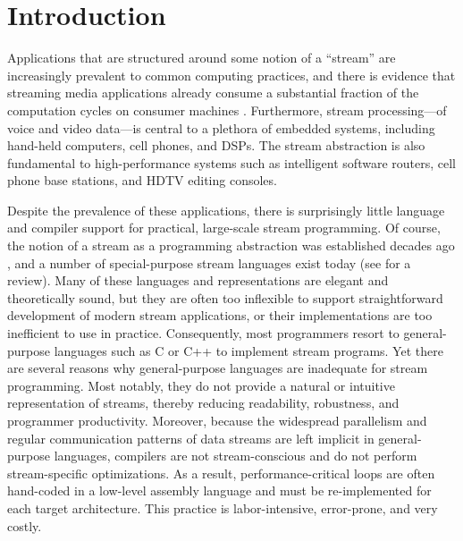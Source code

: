 \section{Introduction}

Applications that  are structured around  some notion of  a ``stream''
are increasingly prevalent to common computing practices, and there is
evidence   that  streaming  media   applications  already   consume  a
substantial fraction  of the  computation cycles on  consumer machines
\cite{rixner98bandwidthefficient}. Furthermore, stream processing---of voice and video
data---is  central  to  a  plethora  of  embedded  systems,  including
hand-held computers, cell phones,  and DSPs. The stream abstraction is
also  fundamental  to  high-performance  systems such  as  intelligent
software routers, cell phone base stations, and HDTV editing consoles.

Despite the  prevalence of  these applications, there  is surprisingly
little language and compiler support for practical, large-scale stream
programming.   Of course,  the notion  of  a stream  as a  programming
abstraction was  established decades ago \cite{SICP}, and  a number of
special-purpose stream languages  exist today (see \cite{survey97} for
a review).   Many of these  languages and representations  are elegant
and theoretically sound, but they  are often too inflexible to support
straightforward  development of modern  stream applications,  or their
implementations are too inefficient to use in practice.  Consequently,
most programmers resort to general-purpose  languages such as C or C++
to  implement  stream programs.  Yet  there  are  several reasons  why
general-purpose languages are  inadequate for stream programming. Most
notably, they do not provide  a natural or intuitive representation of
streams,  thereby  reducing  readability, robustness,  and  programmer
productivity.   Moreover,  because   the  widespread  parallelism  and
regular communication  patterns of data  streams are left  implicit in
general-purpose languages,  compilers are not  stream-conscious and do
not   perform    stream-specific   optimizations.    As    a   result,
performance-critical  loops  are   often  hand-coded  in  a  low-level
assembly  language   and  must  be  re-implemented   for  each  target
architecture.  This practice is labor-intensive, error-prone, and very
costly. 

